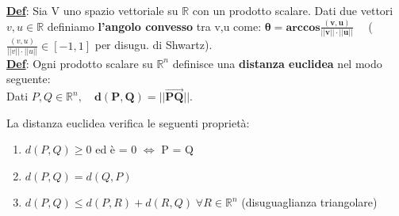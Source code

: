 \documentclass[12pt]{article}
\begin{document}
\noindent \textbf{\underline{Def}}: Sia V uno spazio vettoriale su $\mathbb{R}$ con un prodotto scalare. Dati due vettori $v,u \in \mathbb{R}$  definiamo \textbf{l'angolo convesso} tra v,u come: 
$\boldsymbol{\theta = arccos\frac{(v,u)}{||v||\cdot||u||}}\quad$ ($\frac{(v,u)}{||v||\cdot||u||} \in
[-1,1]$ per disugu. di Shwartz).\\

\noindent \textbf{\underline{Def}}: Ogni prodotto scalare su $\mathbb{R}^n$ definisce una \textbf{distanza euclidea} nel modo seguente:\\
Dati $P,Q \in \mathbb{R}^n,\quad \boldsymbol{d(P,Q) = ||\overrightarrow{PQ}||}$.

\begin{theorem}
    La distanza euclidea verifica le seguenti proprietà:\begin{enumerate}
        \item $d(P,Q) \ge 0$ ed è = 0 $\iff$ P = Q
        \item $d(P,Q) = d(Q,P)$
        \item $d(P,Q) \leq d(P,R)+d(R,Q) \; \forall R \in \mathbb{R}^n$ (disuguaglianza triangolare)
    \end{enumerate}
\end{theorem}
\end{document}
